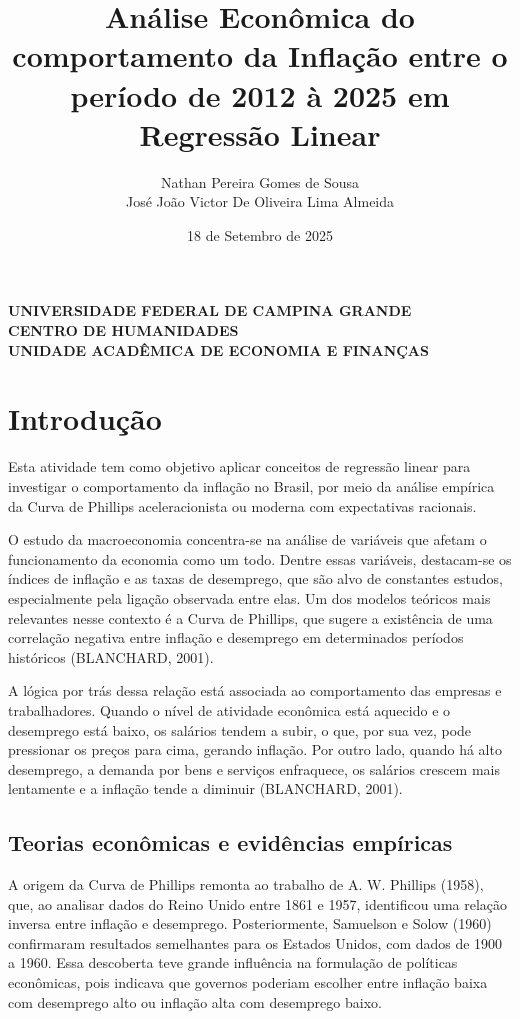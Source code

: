 \documentclass[12pt,oneside]{abntex2}
\title{Análise Econômica do comportamento da Inflação entre o período de 2012 à 2025 em Regressão Linear}
\author{Nathan Pereira Gomes de Sousa \\ José João Victor De Oliveira Lima Almeida }
\date{18 de Setembro de 2025}
\begin{document}
\begin{center}
{\textbf{\fontsize{14}{16}\selectfont 
UNIVERSIDADE FEDERAL DE CAMPINA GRANDE\\[1ex]
CENTRO DE HUMANIDADES\\[1ex]
UNIDADE ACADÊMICA DE ECONOMIA E FINANÇAS}}
\end{center}

\imprimircapa

\imprimirfolhaderosto*

\tableofcontents*
\newpage

\section{\textbf{Introdução}}

Esta atividade tem como objetivo aplicar conceitos de regressão linear para investigar o comportamento da inflação no Brasil, por meio da análise empírica da Curva de Phillips aceleracionista ou moderna com expectativas racionais.

O estudo da macroeconomia concentra-se na análise de variáveis que afetam o funcionamento da economia como um todo. Dentre essas variáveis, destacam-se os índices de inflação e as taxas de desemprego, que são alvo de constantes estudos, especialmente pela ligação observada entre elas. Um dos modelos teóricos mais relevantes nesse contexto é a Curva de Phillips, que sugere a existência de uma correlação negativa entre inflação e desemprego em determinados períodos históricos (BLANCHARD, 2001).

A lógica por trás dessa relação está associada ao comportamento das empresas e trabalhadores. Quando o nível de atividade econômica está aquecido e o desemprego está baixo, os salários tendem a subir, o que, por sua vez, pode pressionar os preços para cima, gerando inflação. Por outro lado, quando há alto desemprego, a demanda por bens e serviços enfraquece, os salários crescem mais lentamente e a inflação tende a diminuir (BLANCHARD, 2001).

\subsection*{\textbf{Teorias econômicas e evidências empíricas}}

A origem da Curva de Phillips remonta ao trabalho de A. W. Phillips (1958), que, ao analisar dados do Reino Unido entre 1861 e 1957, identificou uma relação inversa entre inflação e desemprego. Posteriormente, Samuelson e Solow (1960) confirmaram resultados semelhantes para os Estados Unidos, com dados de 1900 a 1960. Essa descoberta teve grande influência na formulação de políticas econômicas, pois indicava que governos poderiam escolher entre inflação baixa com desemprego alto ou inflação alta com desemprego baixo.  
\end{document}
